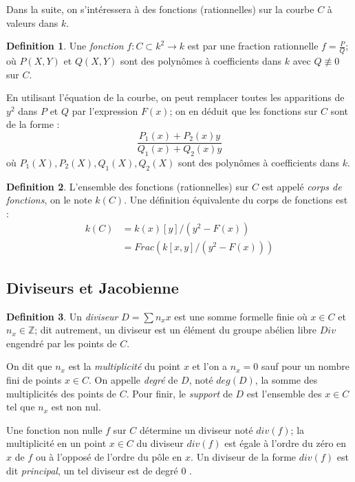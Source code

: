 \documentclass[a4paper]{article}
\theoremstyle{definition}
\newtheorem{definition}{Definition}[section]
\theoremstyle{remark}
\numberwithin{equation}{section}
\begin{document}
Dans la suite, on s'intéressera à des fonctions (rationnelles) sur la courbe $C$ à valeurs dans $k$.
\begin{definition}
Une \emph{fonction} $f : C \subset k^2 \longrightarrow k$ est par une fraction rationnelle $f = \frac{P}{Q}$; où $P(X,Y)$ et $Q(X,Y)$ sont des polynômes à coefficients dans $k$ avec $Q \not\equiv 0$ sur $C$.
\end{definition}

En utilisant l'équation de la courbe, on peut remplacer toutes les apparitions de $y^2$ dans $P$ et $Q$ par l'expression $F(x)$; on en déduit que les fonctions sur $C$ sont de la forme :
$$\frac{P_1(x) + P_2(x)y}{Q_1(x) + Q_2(x)y}$$
où $P_1(X),P_2(X),Q_1(X),Q_2(X)$ sont des polynômes à coefficients dans $k$.

\begin{definition}
L'ensemble des fonctions (rationnelles) sur $C$ est appelé \emph{corps de fonctions}, on le note $k(C)$. Une définition équivalente du corps de fonctions est :
\begin{align*}
k(C) &= k(x)[y]/(y^2-F(x)) \\
  &= Frac(k[x,y]/(y^2-F(x)))
\end{align*}
\end{definition}

\subsection{Diviseurs et Jacobienne}

\begin{definition}
Un \emph{diviseur} $D = \sum n_x x$ est une somme formelle finie où $x \in C$ et $n_x \in \mathbb{Z}$; dit autrement, un diviseur est un élément du groupe abélien libre $Div$ engendré par les points de $C$.

On dit que $n_x$ est la \emph{multiplicité} du point $x$ et l'on a $n_x = 0$ sauf pour un nombre fini de points $x \in C$. On appelle \emph{degré} de $D$, noté $deg(D)$, la somme des multiplicités des points de $C$. Pour finir, le \emph{support} de $D$ est l'ensemble des $x \in C$ tel que $n_x$ est non nul.
\end{definition}

Une fonction non nulle $f$ sur $C$ détermine un diviseur noté $div(f)$; la multiplicité en un point $x \in C$ du diviseur $div(f)$ est égale à l'ordre du zéro en $x$ de $f$ ou à l'opposé de l'ordre du pôle en $x$. Un diviseur de la forme $div(f)$ est dit \emph{principal}, un tel diviseur est de degré 0 \citep{menezes}.
\end{document}
